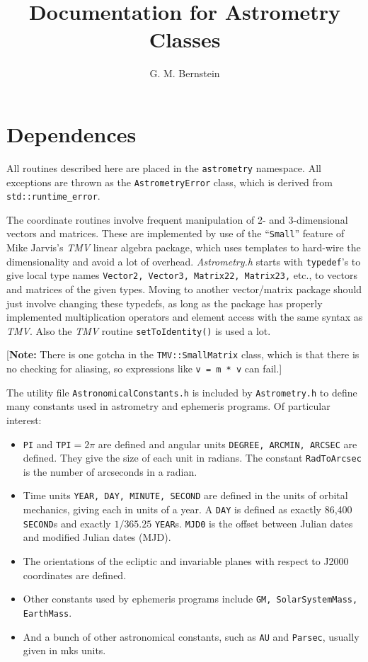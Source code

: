\documentclass[11pt,preprint,flushrt]{aastex}
\begin{document}
\title{Documentation for Astrometry Classes}

\author{G. M. Bernstein}

\section{Dependences}
All routines described here are placed in the {\tt astrometry} namespace.  All exceptions are thrown as the {\tt AstrometryError} class, which is derived from {\tt std::runtime\_error}.

The coordinate routines involve frequent manipulation of 2- and 3-dimensional vectors and matrices.  These are implemented by use of the ``{\tt Small}'' feature of Mike Jarvis's {\it TMV} linear algebra package, which uses templates to hard-wire the dimensionality and avoid a lot of overhead.  {\it Astrometry.h} starts with {\tt typedef}'s to give local type names {\tt Vector2, Vector3, Matrix22, Matrix23,} etc., to vectors and matrices of the given types.  Moving to another vector/matrix package should just involve changing these typedefs, as long as the package has properly implemented multiplication operators and element access with the same syntax as {\it TMV}.  Also the {\it TMV} routine {\tt setToIdentity()} is used a lot.

[{\bf Note:} There is one gotcha in the {\tt TMV::SmallMatrix} class, which is that there is no checking for aliasing, so expressions like {\tt v = m * v} can fail.]

The utility file {\tt AstronomicalConstants.h} is included by {\tt Astrometry.h} to define many constants used in astrometry and ephemeris programs.  Of particular interest:
\begin{itemize}
\item {\tt PI} and {\tt TPI}$=2\pi$ are defined and angular units {\tt DEGREE, ARCMIN, ARCSEC} are defined.  They give the size of each unit in radians.  The constant {\tt RadToArcsec} is the number of arcseconds in a radian.
\item Time units {\tt YEAR, DAY, MINUTE, SECOND} are defined in the units of orbital mechanics, giving each in units of a year.  A {\tt DAY} is defined as exactly 86,400 {\tt SECOND}s and exactly $1/365.25$ {\tt YEAR}s.  {\tt MJD0} is the offset between Julian dates and modified Julian dates (MJD).
\item The orientations of the ecliptic and invariable planes with respect to J2000 coordinates are defined.
\item Other constants used by ephemeris programs include {\tt GM, SolarSystemMass, EarthMass}.
\item And a bunch of other astronomical constants, such as {\tt AU} and {\tt Parsec}, usually given in mks units.
\end{itemize}
\end{document}
